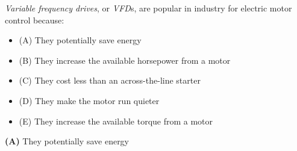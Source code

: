 

{\it Variable frequency drives}, or {\it VFD}s, are popular in industry for electric motor control because:

\begin{itemize}
\item{(A)} They potentially save energy
\vskip 5pt 
\item{(B)} They increase the available horsepower from a motor
\vskip 5pt 
\item{(C)} They cost less than an across-the-line starter
\vskip 5pt 
\item{(D)} They make the motor run quieter
\vskip 5pt 
\item{(E)} They increase the available torque from a motor
\end{itemize}







{\bf (A)} They potentially save energy











